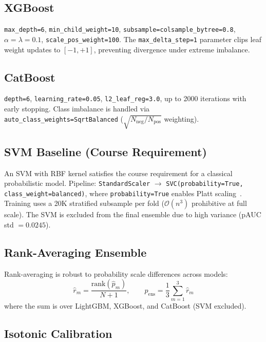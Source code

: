 \documentclass[conference]{IEEEtran}
\begin{document}
\subsection{XGBoost~\cite{chen2016xgboost}}

\texttt{max\_depth=6}, \texttt{min\_child\_weight=10},
\texttt{subsample=colsample\_bytree=0.8}, $\alpha=\lambda=0.1$,
\texttt{scale\_pos\_weight=100}.
The \texttt{max\_delta\_step=1} parameter clips leaf weight updates to
$[-1, +1]$, preventing divergence under extreme imbalance.

\subsection{CatBoost~\cite{prokhorenkova2018catboost}}

\texttt{depth=6}, \texttt{learning\_rate=0.05}, \texttt{l2\_leaf\_reg=3.0},
up to 2000 iterations with early stopping.
Class imbalance is handled via \texttt{auto\_class\_weights=SqrtBalanced}
($\sqrt{N_\text{neg}/N_\text{pos}}$ weighting).

\subsection{SVM Baseline (Course Requirement)~\cite{cortes1995svm}}

An SVM with RBF kernel satisfies the course requirement for a classical
probabilistic model.
Pipeline: \texttt{StandardScaler} $\to$ \texttt{SVC(probability=True,
class\_weight=balanced)}, where \texttt{probability=True} enables Platt
scaling~\cite{platt1999}.
Training uses a 20K stratified subsample per fold ($\mathcal{O}(n^3)$
prohibitive at full scale).
The SVM is excluded from the final ensemble due to high variance
(pAUC std $= 0.0245$).

\subsection{Rank-Averaging Ensemble}

Rank-averaging is robust to probability scale differences across models:
\begin{equation}
  \hat{r}_m = \frac{\text{rank}(\hat{p}_m)}{N+1},
  \qquad
  \hat{p}_{\text{ens}} = \frac{1}{3}\sum_{m=1}^{3}\hat{r}_m
  \label{eq:rankavg}
\end{equation}
where the sum is over LightGBM, XGBoost, and CatBoost (SVM excluded).

\subsection{Isotonic Calibration~\cite{niculescu2005}}
\end{document}
